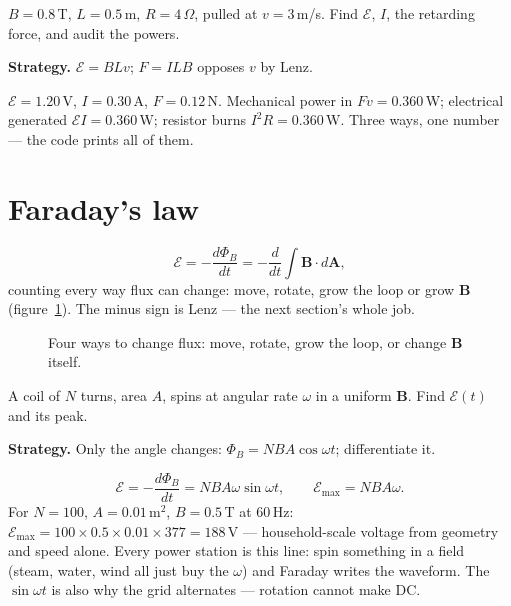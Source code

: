 \begin{example}\label{ex:rod}
$B=0.8$\,T, $L=0.5$\,m, $R=4\,\Omega$, pulled at $v=3$\,m/s. Find
$\mathcal E$, $I$, the retarding force, and audit the powers.
\par\smallskip
\textbf{Strategy.} $\mathcal E=BLv$; $F=ILB$ opposes $v$ by Lenz.
\begin{solution}
$\mathcal E=1.20$\,V, $I=0.30$\,A, $F=0.12$\,N. Mechanical power in
$Fv=0.360$\,W; electrical generated $\mathcal EI=0.360$\,W; resistor
burns $I^{2}R=0.360$\,W. Three ways, one number --- the code prints
all of them. \checkmark
\end{solution}
\end{example}

\section{Faraday's law}\label{sec:far-law}

\begin{equation}
  \mathcal E=-\frac{d\Phi_B}{dt}
  =-\frac{d}{dt}\int\mathbf B\cdot d\mathbf A,\label{eq:far}
\end{equation}
counting every way flux can change: move, rotate, grow the loop or grow
$\mathbf B$ (figure~\ref{fig:flux4}). The minus sign is Lenz ---
the next section's whole job.

\begin{figure}[htbp]\centering

\caption{Four ways to change flux: move, rotate, grow the loop, or
change $\mathbf B$ itself.}
\label{fig:flux4}
\end{figure}

\begin{example}\label{ex:gen}
A coil of $N$ turns, area $A$, spins at angular rate $\omega$ in a
uniform $\mathbf B$. Find $\mathcal E(t)$ and its peak.
\par\smallskip
\textbf{Strategy.} Only the angle changes:
$\Phi_B=NBA\cos\omega t$; differentiate it.
\begin{solution}
\[\mathcal E=-\frac{d\Phi_B}{dt}=NBA\omega\sin\omega t,
\qquad \mathcal E_{\max}=NBA\omega.\]
For $N=100$, $A=0.01$\,m$^{2}$, $B=0.5$\,T at $60$\,Hz:
$\mathcal E_{\max}=100\times0.5\times0.01\times377=188$\,V ---
household-scale voltage from geometry and speed alone. Every power
station is this line: spin something in a field (steam, water, wind
all just buy the $\omega$) and Faraday writes the waveform. The
$\sin\omega t$ is also why the grid alternates --- rotation cannot
make DC. \checkmark
\end{solution}
\end{example}

